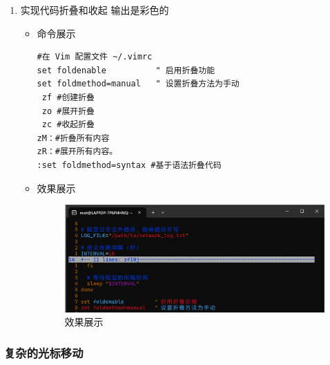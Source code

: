 \documentclass[UTF8]{ctexart}
\begin{document}
\begin{enumerate}
  \item 实现代码折叠和收起
输出是彩色的
  \begin{itemize}
  \item 命令展示
  \begin{verbatim}
#在 Vim 配置文件 ~/.vimrc
set foldenable          " 启用折叠功能
set foldmethod=manual   " 设置折叠方法为手动
 zf #创建折叠
 zo #展开折叠
 zc #收起折叠
zM：#折叠所有内容
zR：#展开所有内容。
:set foldmethod=syntax #基于语法折叠代码
  \end{verbatim}

  \item 效果展示
  \begin{figure}[H]
    \centering
    \includegraphics[width=\textwidth]{28} %
    \caption{效果展示}
  
  \end{figure}
\end{itemize}
\end{enumerate}
\subsubsection{复杂的光标移动}
\end{document}
